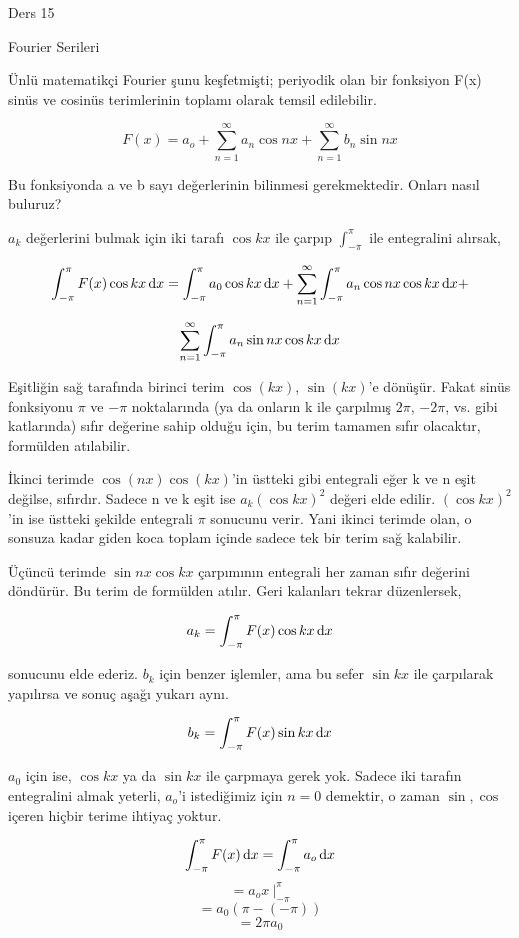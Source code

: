 \documentclass[12pt,fleqn]{article}\usepackage{../../common}
\begin{document}
Ders 15

Fourier Serileri

Ünlü matematikçi Fourier şunu keşfetmişti; periyodik olan bir fonksiyon F(x)
sinüs ve cosinüs terimlerinin toplamı olarak temsil edilebilir.

$$ F(x) = a_o + \sum_{n=1}^{\infty}a_n \cos nx + \sum_{n=1}^{\infty}b_n \sin nx  $$

Bu fonksiyonda a ve b sayı değerlerinin bilinmesi gerekmektedir. Onları nasıl
buluruz? 

$a_k$ değerlerini bulmak için iki tarafı $\cos kx$ ile çarpıp
$\int_{-\pi}^{\pi}$ ile entegralini alırsak,

$$
\int_{-\pi}^{\pi} F(x)\cos kx \,\mathrm{d} x =
\int_{-\pi}^{\pi} a_0 \cos
kx \,\mathrm{d} x +  \sum_{n=1}^{\infty}\int_{-\pi}^{\pi} a_n \cos nx \cos kx \,\mathrm{d} x +
$$

$$ \sum_{n=1}^{\infty}\int_{-\pi}^{\pi} a_n \sin nx \cos kx \,\mathrm{d} x   $$

Eşitliğin sağ tarafında birinci terim $\cos(kx)$, $\sin(kx)$'e dönüşür. Fakat sinüs
fonksiyonu $\pi$ ve $-\pi$ noktalarında (ya da onların k ile çarpılmış $2\pi$,
$-2\pi$, vs. gibi katlarında) sıfır değerine sahip olduğu için, bu terim tamamen
sıfır olacaktır, formülden atılabilir.

İkinci terimde $\cos(nx)\cos(kx)$'in üstteki gibi entegrali eğer k ve n eşit
değilse, sıfırdır. Sadece n ve k eşit ise $a_k(\cos kx)^2$ değeri elde edilir.
$(\cos kx)^2$'in ise üstteki şekilde entegrali $\pi$ sonucunu verir. Yani ikinci
terimde olan, o sonsuza kadar giden koca toplam içinde sadece tek bir terim sağ
kalabilir.

Üçüncü terimde $\sin nx \cos kx$ çarpımının entegrali her zaman
sıfır değerini döndürür. Bu terim de formülden atılır. Geri kalanları tekrar
düzenlersek, 

$$ a_k = \int_{-\pi}^{\pi} F(x)\cos kx \,\mathrm{d} x $$

sonucunu elde ederiz. $b_k$ için benzer işlemler, ama bu sefer $\sin kx$ ile çarpılarak yapılırsa ve
sonuç aşağı yukarı aynı.

$$ b_k = \int_{-\pi}^{\pi} F(x)\sin kx \,\mathrm{d} x $$

$a_0$ için ise, $\cos kx$ ya da $\sin kx$ ile çarpmaya gerek yok. Sadece iki
tarafın entegralini almak yeterli, $a_o$'i istediğimiz için $n=0$ demektir, o
zaman $\sin, \cos$ içeren hiçbir terime ihtiyaç yoktur.

$$  \int_{-\pi}^{\pi} F(x) \,\mathrm{d} x =  \int_{-\pi}^{\pi} a_o \,\mathrm{d} x $$
$$  =  a_o x \ \bigg|_{-\pi}^{\pi}  $$
$$  = a_0 (\pi -(-\pi))  $$
$$  = 2\pi a_0  $$
\end{document}
